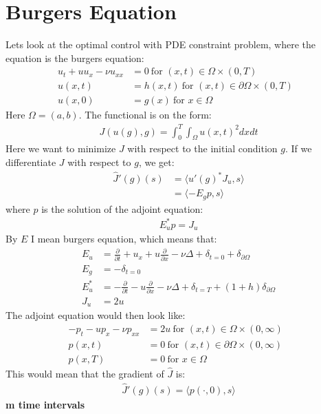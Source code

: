 \documentclass[11pt,a4paper]{article}
\begin{document}
\section{Burgers Equation}
Lets look at the optimal control with PDE constraint problem, where the equation is the burgers equation:
\begin{align*}
u_t + uu_x - \nu u_{xx} &= 0 \ \text{for $(x,t)\in \Omega\times(0,T)$}\\
u(x,t) &= h(x,t) \ \text{for $(x,t) \in\partial\Omega\times(0,T)$ } \\
u(x,0) &= g(x) \ \text{for $x \in\Omega$ }
\end{align*} 
Here $\Omega = (a,b)$. The functional is on the form:
\begin{align*}
J(u(g),g) = \int_0^T\int_{\Omega} u(x,t)^2 dxdt
\end{align*}
Here we want to minimize $J$ with respect to the initial condition $g$. If we differentiate $J$ with respect to $g$, we get:
\begin{align*}
\hat{J}'(g)(s) &= \langle u'(g)^*J_u,s \rangle \\
&= \langle -E_gp,s \rangle
\end{align*}
where $p$ is the solution of the adjoint equation:
\begin{align*}
E_u^*p = J_u
\end{align*}
By $E$ I mean burgers equation, which means that:
\begin{align*}
E_u &= \frac{\partial}{\partial t} + u_x + u\frac{\partial}{\partial x} - \nu\Delta + \delta_{t=0} + \delta_{\partial \Omega} \\
E_g &= -\delta_{t=0} \\
E_u^* &= -\frac{\partial}{\partial t}  -u\frac{\partial}{\partial x}- \nu\Delta + \delta_{t=T} + (1+h)\delta_{\partial \Omega} \\
J_u &= 2u
\end{align*}
The adjoint equation would then look like:
\begin{align*}
-p_t -up_x - \nu p_{xx} &= 2u \ \text{for $(x,t)\in \Omega\times(0,\infty)$}\\
p(x,t) &= 0 \ \text{for $(x,t) \in\partial\Omega\times(0,\infty)$ } \\
p(x,T) &= 0 \ \text{for $x \in\Omega$ }
\end{align*}
This would mean that the gradient of $\hat{J}$ is:
\begin{align*}
\hat{J}'(g)(s) = \langle p(\cdot,0), s\rangle
\end{align*}
\textbf{m time intervals}
\end{document}
